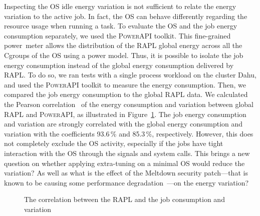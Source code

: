 Inspecting the OS idle energy variation is not sufficient to relate the energy variation to the active job.
In fact, the OS can behave differently regarding the resource usage when running a task.
To evaluate the OS and the job energy consumption separately, we used the \textsc{PowerAPI} toolkit.
This fine-grained power~meter allows the distribution of the RAPL global energy across all the Cgroups of the OS using a power model.
Thus, it is possible to isolate the job energy consumption instead of the global energy consumption delivered by RAPL.
To do so, we ran tests with a single process workload on the cluster \textsf{Dahu}, and used the \textsc{PowerAPI} toolkit to measure the energy consumption.
Then, we compared the job energy consumption to the global RAPL data.
We calculated the Pearson correlation~\cite{ref1} of the energy consumption and variation between global RAPL and \textsc{PowerAPI}, as illustrated in Figure~\ref{fig:correlation}.
The job energy consumption and variation are strongly correlated with the global energy consumption and variation with the coefficients 93.6\,\% and 85.3\,\%, respectively.
However, this does not completely exclude the OS activity, especially if the jobs have tight interaction with the OS through the signals and system calls.
This brings a new question on whether applying extra-tuning on a minimal OS would reduce the variation? As well as what is the effect of the Meltdown security patch---that is known to be causing some performance degradation~\cite{Kocher2018spectre,Lipp2018meltdown}---on the energy variation?

\begin{figure}
    \caption{The correlation between the RAPL and the job consumption and variation}\label{fig:correlation}
\end{figure}

